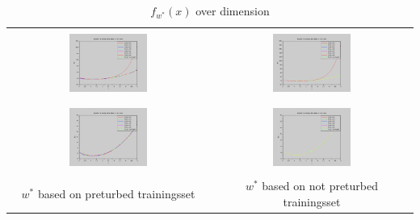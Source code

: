 \documentclass[]{report}
\begin{document}
\begin{table}[h]
\begin{tabular}{| c | c |}
\hline
 & \\
\includegraphics[width=0.4\textwidth]{./images/f_x_w_star_overDimensions.png} & \includegraphics[width=0.4\textwidth]{./images/f_x_w_star_not_preturbed_overDimensions.png} \\
 & \\
 \hline
 & \\
\includegraphics[width=0.4\textwidth]{./images/f_x_w_star_overDimensions_stable.png} & \includegraphics[width=0.4\textwidth]{./images/f_x_w_star_not_preturbed_overDimensions_stable.png} \\
 & \\ 
$w^*$ based on preturbed trainingsset & $w^*$ based on not preturbed trainingsset \\
\hline
\end{tabular}
\caption{$f_{w^*}(x)$ over dimension}
\label{tab:f_x_overDimension}
\end{table}
\end{document}
